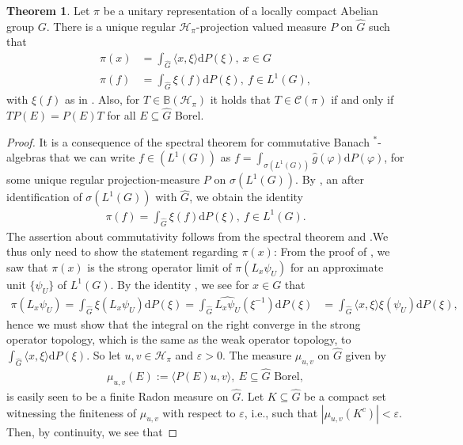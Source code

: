 \documentclass[10pt,twoside,openany,final]{memoir}
\theoremstyle{definition}
\newtheorem{theorem}{Theorem}[chapter]
\theoremstyle{Break}
\newcommand{\G}{\widehat{G}}
\renewcommand{\H}{\mathcal{H}}
\renewcommand{\d}{\mathrm{d}}
\begin{document}
\begin{theorem}
Let $\pi$ be a unitary representation of a locally compact Abelian group $G$. There is a unique regular $\H_\pi$-projection valued measure $P$ on $\G$ such that
\begin{align*}
	\pi(x)&=\int_{\G}\langle x, \xi \rangle \d P(\xi) , \ x \in G\\
	\pi(f)&= \int_{\G}\xi(f) \d P(\xi), \ f \in L^1(G),
\end{align*}
with $\xi(f)$ as in . Also, for $T \in \mathbb{B}(\H_\pi)$ it holds that $T \in \mathcal{C}(\pi)$ if and only if $TP(E)=P(E)T$ for all $E \subseteq \G$ Borel.
	\label{4.44}
\end{theorem}
\begin{proof}
	It is a consequence of the spectral theorem for commutative Banach $^*$-algebras that we can write $f \in (L^1(G))$ as $f=\int_{\sigma(L^1(G))} \widehat{g}(\varphi) \d P(\varphi)$, for some unique regular projection-measure $P$ on $\sigma(L^1(G))$. By , an after identification of $\sigma(L^1(G))$ with $\G$, we obtain the identity
	\begin{align*}
		\pi(f)=\int_{\G} \xi(f) \d P(\xi), \ f \in L^1(G).
	\end{align*}
	The assertion about commutativity follows from the spectral theorem and .We thus only need to show the statement regarding $\pi(x)$: From the proof of , we saw that $\pi(x)$ is the strong operator limit of $\pi(L_x\psi_U)$ for an approximate unit $\{\psi_U\}$ of $L^1(G)$. By the identity , we see for $x \in G$ that
	\begin{align*}
		\pi(L_x \psi_U) = \int_{\G} \xi(L_x \psi_U) \d P(\xi) =\int_{\G}\widehat{L_x \psi_U}(\xi^{-1})\d P(\xi)&= \int_{\G}\langle x,\xi \rangle \xi(\psi_U)\d P(\xi),
	\end{align*}
	hence we must show that the integral on the right converge in the strong operator topology, which is the same as the weak operator topology, to $\int_{\G}\langle x , \xi \rangle \d P(\xi)$. So let $u,v \in \H_\pi$ and $\varepsilon > 0$. The measure $\mu_{u,v}$ on $\G$ given by
	\begin{align*}
		\mu_{u,v}(E):=\langle P(E) u,v \rangle, \ E \subseteq \G \text{ Borel},
	\end{align*}
	is easily seen to be a finite Radon measure on $\G$. Let $K\subseteq \G$ be a compact set witnessing the finiteness of $\mu_{u,v}$ with respect to $\varepsilon$, i.e., such that $|\mu_{u,v}(K^c)|<\varepsilon$. Then, by continuity, we see that

\end{proof}
\end{document}
